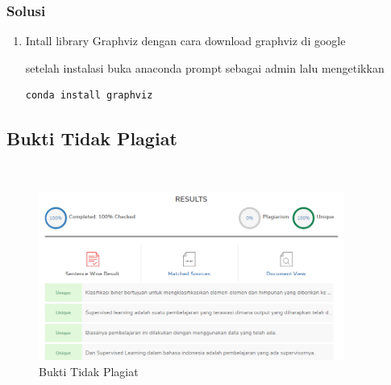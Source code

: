\subsubsection{Solusi}
\begin{enumerate}
\item Intall library Graphviz dengan cara download graphviz di google

setelah instalasi buka anaconda prompt sebagai admin lalu mengetikkan
\begin{lstlisting}
conda install graphviz
\end{lstlisting} 
\end{enumerate}

\subsection{Bukti Tidak Plagiat}
\hfill\\
\begin{figure}[H]
\centerline{\includegraphics[width=10cm]{figures/1174077/2/plagiat.png}}
\caption{Bukti Tidak Plagiat}
\label{labelgambar}
\end{figure}
